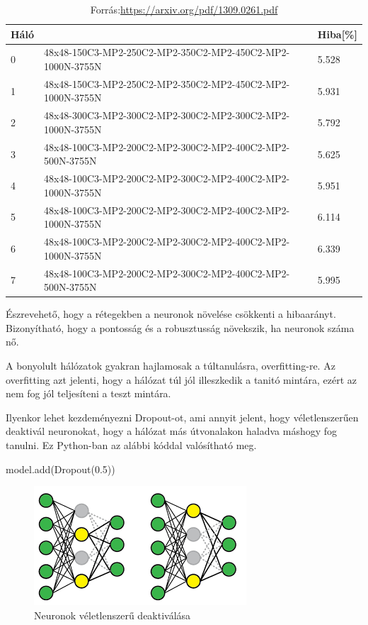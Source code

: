 \begin{table}[h]
\centering
\caption{Forrás:\url{https://arxiv.org/pdf/1309.0261.pdf}}
\begin{tabular}{|l|l|l|}
\hline
 Háló &                                                                      & Hiba[\%] \\ \hline
0               & 48x48-150C3-MP2-250C2-MP2-350C2-MP2-450C2-MP2-1000N-3755N & 5.528 \\ \hline
1               & 48x48-150C3-MP2-250C2-MP2-350C2-MP2-450C2-MP2-1000N-3755N & 5.931 \\ \hline
2               & 48x48-300C3-MP2-300C2-MP2-300C2-MP2-300C2-MP2-1000N-3755N & 5.792 \\ \hline
3               & 48x48-100C3-MP2-200C2-MP2-300C2-MP2-400C2-MP2-500N-3755N  & 5.625 \\ \hline
4               & 48x48-100C3-MP2-200C2-MP2-300C2-MP2-400C2-MP2-1000N-3755N & 5.951 \\ \hline
5               & 48x48-100C3-MP2-200C2-MP2-300C2-MP2-400C2-MP2-1000N-3755N & 6.114 \\ \hline
6               & 48x48-100C3-MP2-200C2-MP2-300C2-MP2-400C2-MP2-1000N-3755N & 6.339 \\ \hline
7               & 48x48-100C3-MP2-200C2-MP2-300C2-MP2-400C2-MP2-500N-3755N  & 5.995 \\ \hline
\end{tabular}
\end{table}

Észrevehető, hogy a rétegekben a neuronok növelése csökkenti a hibaarányt. Bizonyítható, hogy a pontosság és a robusztusság növekszik, ha neuronok száma nő.

A bonyolult hálózatok gyakran hajlamosak a túltanulásra, overfitting-re. Az overfitting azt jelenti, hogy a hálózat túl jól illeszkedik a tanitó mintára, ezért az nem fog jól teljesíteni a teszt mintára.

Ilyenkor lehet kezdeményezni Dropout-ot, ami annyit jelent, hogy véletlenszerűen deaktivál neuronokat, hogy a hálózat más útvonalakon haladva máshogy fog tanulni. Ez Python-ban az alábbi kóddal valósítható meg.
\begin{python}
model.add(Dropout(0.5))
\end{python}

\begin{figure}[h]
\centering
\includegraphics[scale=0.8]{images/dropout}
\caption{Neuronok véletlenszerű deaktiválása}
\label{fig:dropout}
\end{figure} 


